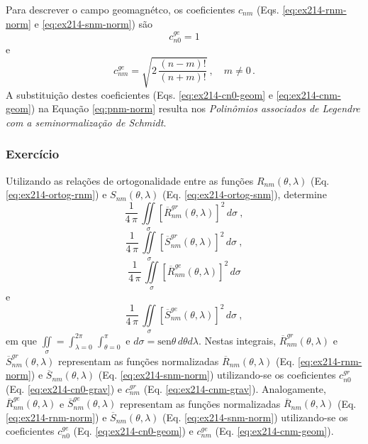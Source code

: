 \documentclass[10pt,a4paper,fleqn]{article}
\begin{document}
Para descrever o campo geomagn\'{e}tco, os coeficientes $c_{nm}$ 
(Eqs. \ref{eq:ex214-rnm-norm} e \ref{eq:ex214-snm-norm}) são 
\begin{equation}
c_{n0}^{ge} = 1
\label{eq:ex214-cn0-geom}
\end{equation}
e
\begin{equation}
c_{nm}^{ge} = \sqrt{2 \, \dfrac{(n - m)!}{(n + m)!}} \: , \quad m \neq 0 \, .
\label{eq:ex214-cnm-geom}
\end{equation}
A substitui\c{c}\~{a}o destes coeficientes (Eqs. \ref{eq:ex214-cn0-geom} e
\ref{eq:ex214-cnm-geom}) na Equa\c{c}\~{a}o \ref{eq:pnm-norm} resulta
nos \textit{Polin\^{o}mios associados de Legendre com a 
seminormaliza\c{c}\~{a}o de Schmidt}.

\begin{flushleft}
\dotfill
\end{flushleft}

\subsubsection{Exerc\'{i}cio}

Utilizando as rela\c{c}\~{o}es de ortogonalidade entre as fun\c{c}\~{o}es $R_{nm}(\theta, \lambda)$ 
(Eq. \ref{eq:ex214-ortog-rnm}) e $S_{nm}(\theta, \lambda)$ (Eq. \ref{eq:ex214-ortog-snm}),
determine 
$$\dfrac{1}{4 \, \pi} \, \iint \limits_{\sigma} \left[ \overline{R}_{nm}^{gr} (\theta, \lambda)
\right]^{2} \, d \sigma \: ,$$ 
$$\dfrac{1}{4 \, \pi} \, \iint \limits_{\sigma} \left[ \overline{S}_{nm}^{gr} (\theta, \lambda)
\right]^{2} \, d \sigma \: ,$$ 
$$\dfrac{1}{4 \, \pi} \, \iint \limits_{\sigma} \left[ \overline{R}_{nm}^{ge} (\theta, \lambda)
\right]^{2} \, d \sigma$$ 
e
$$\dfrac{1}{4 \, \pi} \, \iint \limits_{\sigma} \left[ \overline{S}_{nm}^{ge}  (\theta, \lambda)
\right]^{2} \, d \sigma \: ,$$
em que $\iint \limits_{\sigma} = \int_{\lambda = 0}^{2\pi} \, \int_{\theta = 0}^{\pi}$ e $d \sigma 
= \text{sen}\theta \, d\theta d\lambda$. Nestas integrais, $\overline{R}_{nm}^{gr} (\theta, \lambda)$ e 
$\overline{S}_{nm}^{gr} (\theta, \lambda)$ representam as fun\c{c}\~{o}es normalizadas $\overline{R}_{nm}
(\theta, \lambda)$ (Eq. \ref{eq:ex214-rnm-norm}) e $\overline{S}_{nm} (\theta, \lambda)$ 
(Eq. \ref{eq:ex214-snm-norm}) utilizando-se os coeficientes $c_{n0}^{gr}$ (Eq. \ref{eq:ex214-cn0-grav}) 
e $c_{nm}^{gr}$ (Eq. \ref{eq:ex214-cnm-grav}). Analogamente, $\overline{R}_{nm}^{ge} (\theta, \lambda)$ 
e $\overline{S}_{nm}^{ge} (\theta, \lambda)$ representam as fun\c{c}\~{o}es normalizadas 
$\overline{R}_{nm} (\theta, \lambda)$ (Eq. \ref{eq:ex214-rnm-norm}) e $\overline{S}_{nm} (\theta, \lambda)$ 
(Eq. \ref{eq:ex214-snm-norm}) utilizando-se os coeficientes $c_{n0}^{ge}$ 
(Eq. \ref{eq:ex214-cn0-geom}) e $c_{nm}^{ge}$ (Eq. \ref{eq:ex214-cnm-geom}).
\end{document}
